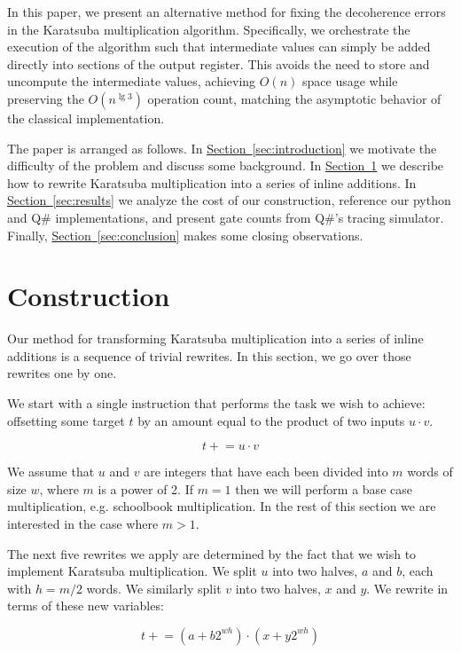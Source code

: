 \documentclass[onecolumn]{quantumarticle}
\renewcommand{\sec}[1]{\hyperref[sec:#1]{Section~\ref*{sec:#1}}}
\begin{document}
In this paper, we present an alternative method for fixing the decoherence errors in the Karatsuba multiplication algorithm.
Specifically, we orchestrate the execution of the algorithm such that intermediate values can simply be added directly into sections of the output register.
This avoids the need to store and uncompute the intermediate values, achieving $O(n)$ space usage while preserving the $O(n^{\lg 3})$ operation count, matching the asymptotic behavior of the classical implementation.

The paper is arranged as follows.
In \sec{introduction} we motivate the difficulty of the problem and discuss some background.
In \sec{methods} we describe how to rewrite Karatsuba multiplication into a series of inline additions.
In \sec{results} we analyze the cost of our construction, reference our python and Q\# implementations, and present gate counts from Q\#'s tracing simulator.
Finally, \sec{conclusion} makes some closing observations.

\section{Construction}
\label{sec:methods}

\newcommand{\pluseq}{\mathrel{+}=}
\newcommand{\minuseq}{\mathrel{-}=}
\newcommand{\timeseq}{\mathrel{\ast}=}

Our method for transforming Karatsuba multiplication into a series of inline additions is a sequence of trivial rewrites.
In this section, we go over those rewrites one by one.

We start with a single instruction that performs the task we wish to achieve: offsetting some target $t$ by an amount equal to the product of two inputs $u \cdot v$.

$$t \pluseq u \cdot v$$

We assume that $u$ and $v$ are integers that have each been divided into $m$ words of size $w$, where $m$ is a power of 2.
If $m=1$ then we will perform a base case multiplication, e.g. schoolbook multiplication.
In the rest of this section we are interested in the case where $m>1$.

The next five rewrites we apply are determined by the fact that we wish to implement Karatsuba multiplication.
We split $u$ into two halves, $a$ and $b$, each with $h=m/2$ words.
We similarly split $v$ into two halves, $x$ and $y$.
We rewrite in terms of these new variables:

$$t \pluseq (a + b 2^{wh}) \cdot (x + y 2^{wh})$$
\end{document}
